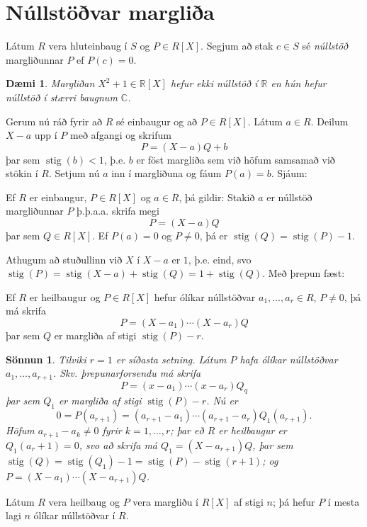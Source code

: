 \documentclass[a4paper,icelandic,11pt]{book}
\theoremstyle{plain}
\newtheorem{daemi}{Dæmi}[chapter]
\newtheorem*{sonnun}{Sönnun}
\newcommand{\R}{\mathbb{R}}
\newcommand{\C}{\mathbb{C}}
\DeclareMathOperator{\stig}{stig} %
\begin{document}
\section{Núllstöðvar margliða}
\begin{skilgr}
  Látum $R$ vera hluteinbaug í $S$ og $P\in R[X]$. Segjum að stak $c\in S$ sé
  \emph{núllstöð} margliðunnar $P$ ef
  $P(c) = 0$.
\end{skilgr}
\begin{daemi}
  Margliðan $X^2 + 1\in\R[X]$ hefur ekki núllstöð í $\R$ en hún hefur núllstöð í
  stærri baugnum $\C$.
\end{daemi}
Gerum nú ráð fyrir að $R$ sé einbaugur og að $P\in R[X]$. Látum $a\in R$. Deilum
$X-a$ upp í $P$ með afgangi og skrifum\[
P = (X-a)Q + b
\]
þar sem $\stig(b) < 1$, þ.e. $b$ er föst margliða sem við höfum samsamað við
stökin í $R$. Setjum nú $a$ inn í margliðuna og fáum $P(a) = b$. Sjáum:
\begin{setn}
  Ef $R$ er einbaugur, $P\in R[X]$ og $a\in R$, þá gildir: Stakið $a$ er
  núllstöð margliðunnar $P$ þ.þ.a.a. skrifa megi \[ P = (X-a) Q \] þar sem
  $Q\in R[X]$. Ef $P(a) = 0$ og $P\neq 0$, þá er $\stig(Q) = \stig(P)-1$.
\end{setn}
Athugum að stuðullinn við $X$ í $X-a$ er $1$, þ.e. eind, svo
$\stig(P)=\stig(X-a)+\stig(Q)=1+\stig(Q)$. Með þrepun fæst:
\begin{setn}
  Ef $R$ er heilbaugur og $P\in R[X]$ hefur ólíkar núllstöðvar $a_1,\dots,a_r\in
  R$, $P\neq 0$, þá má skrifa \[
  P = (X-a_1)\cdots(X-a_r)Q
  \]
  þar sem $Q$ er margliða af stigi $\stig(P)-r$.
\end{setn}
\begin{sonnun}
  Tilviki $r=1$ er síðasta setning. Látum $P$ hafa ólíkar núllstöðvar
  $a_1,\dots,a_{r+1}$. Skv. þrepunarforsendu má skrifa \[
  P = (x-a_1)\cdots(x-a_r)Q_q
  \]
  þar sem $Q_1$ er margliða af stigi $\stig(P)-r$. Nú er \[
  0 = P(a_{r+1})=(a_{r+1}-a_1)\cdots (a_{r+1}-a_r)Q_1(a_{r+1}).
  \]
  Höfum $a_{r+1}-a_k\neq 0$ fyrir $k=1,\dots,r$;  þar eð $R$ er
  \emph{heilbaugur} er $Q_1(a_r+1)=0$, svo að skrifa má $Q_1=(X-a_{r+1})Q$, þar
  sem $\stig(Q)=\stig(Q_1)-1 = \stig(P)-\stig(r+1)$; og $P =
  (X-a_1)\cdots(X-a_{r+1})Q$.
\end{sonnun}
\begin{fylgisetn}
  Látum $R$ vera heilbaug og $P$ vera margliðu í $R[X]$ af stigi $n$; þá hefur
  $P$ í mesta lagi $n$ ólíkar núllstöðvar í $R$.
\end{fylgisetn}
\end{document}
